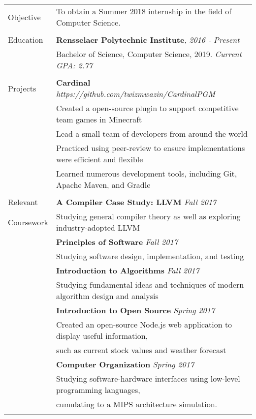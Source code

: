 \documentclass[letterpaper,10pt,oneside]{article}
\begin{document}
\noindent
\begin{tabular}{@{} l l}

  \Large{Objective}
  & To obtain a Summer 2018 internship in the field of Computer Science. \\
  & \\

  \Large{Education}
  & \textbf{Rensselaer Polytechnic Institute}, \textit{2016 - Present} \\
  & Bachelor of Science, Computer Science, 2019. \textit{Current GPA: 2.77} \\
  & \\

  \Large{Projects}
  & \textbf{Cardinal} \textit{https://github.com/twizmwazin/CardinalPGM} \\
  & Created a open-source plugin to support competitive team games in Minecraft \\
  & Lead a small team of developers from around the world \\
  & Practiced using peer-review to ensure implementations were efficient and flexible \\
  & Learned numerous development tools, including Git, Apache Maven, and Gradle \\
  & \\

  \Large{Relevant}
  & \textbf{A Compiler Case Study: LLVM} \textit{Fall 2017} \\
  \Large{Coursework}
  & Studying general compiler theory as well as exploring industry-adopted LLVM \\
  & \textbf{Principles of Software} \textit{Fall 2017} \\
  & Studying software design, implementation, and testing \\
  & \textbf{Introduction to Algorithms} \textit{Fall 2017} \\
  & Studying fundamental ideas and techniques of modern algorithm design and analysis \\
  & \textbf{Introduction to Open Source} \textit{Spring 2017} \\
  & Created an open-source Node.js web application to display useful information, \\
  & such as current stock values and weather forecast \\
  & \textbf{Computer Organization} \textit{Spring 2017} \\
  & Studying software-hardware interfaces using low-level programming languages, \\
  & cumulating to a MIPS architecture simulation. \\
  & \\


\end{tabular}
\end{document}
